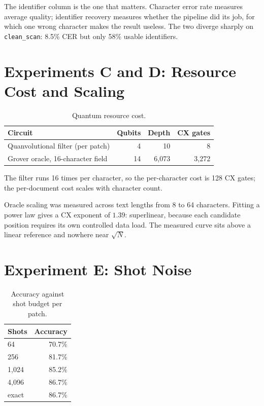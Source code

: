 \documentclass[11pt,a4paper]{article}
\begin{document}
The identifier column is the one that matters. Character error rate measures
average quality; identifier recovery measures whether the pipeline did its job,
for which one wrong character makes the result useless. The two diverge sharply
on \texttt{clean\_scan}: 8.5\% CER but only 58\% usable identifiers.

\section{Experiments C and D: Resource Cost and Scaling}

\begin{table}[h]
\centering
\caption{Quantum resource cost.}
\begin{tabular}{@{}lrrr@{}}
\toprule
Circuit & Qubits & Depth & CX gates \\
\midrule
Quanvolutional filter (per patch) & 4 & 10 & 8 \\
Grover oracle, 16-character field & 14 & 6{,}073 & 3{,}272 \\
\bottomrule
\end{tabular}
\end{table}

The filter runs 16 times per character, so the per-character cost is 128 CX
gates; the per-document cost scales with character count.

Oracle scaling was measured across text lengths from 8 to 64 characters. Fitting
a power law gives a CX exponent of $\mathbf{1.39}$: superlinear, because each
candidate position requires its own controlled data load. The measured curve
sits above a linear reference and nowhere near $\sqrt{N}$.

\section{Experiment E: Shot Noise}

\begin{table}[h]
\centering
\caption{Accuracy against shot budget per patch.}
\begin{tabular}{@{}lr@{}}
\toprule
Shots & Accuracy \\
\midrule
64 & 70.7\% \\
256 & 81.7\% \\
1{,}024 & 85.2\% \\
4{,}096 & 86.7\% \\
exact & 86.7\% \\
\bottomrule
\end{tabular}
\end{table}
\end{document}
